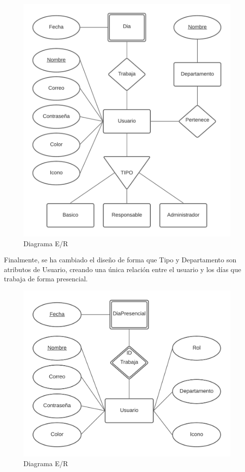 \documentclass[11pt,spanish,listoffigures,listoftables]{tfgetsinf}
\begin{document}
\begin{figure}[h!] %
  \centering
   \includegraphics[scale=0.50]{img/EntidadRelacion.png}
   \caption{Diagrama E/R}
   \label{fig:diagramaer}
 \end{figure}

 Finalmente, se ha cambiado el diseño de forma que Tipo y Departamento son atributos de Usuario, creando una única relación entre el usuario y los días que trabaja de forma presencial.
 \begin{figure}[h!] %
  \centering
   \includegraphics[scale=0.40]{img/DiagramaERFinal.png}
   \caption{Diagrama E/R}
   \label{fig:diagramaerfinal}
 \end{figure}
\end{document}
